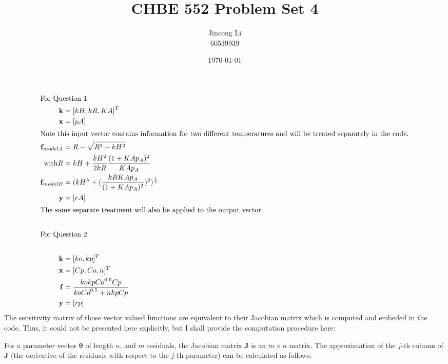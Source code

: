 \documentclass[a4paper,12pt]{article} %
\begin{document}
\setlength{\parskip}{1em} 
\setlength{\parindent}{0pt}
\newcommand{\vect}[1]{\mathbf{#1}}

\title{CHBE 552 Problem Set 4}
\author{Jincong Li \\ 60539939}
\date{\today}
\maketitle

\begin{align*}
    \intertext{For Question 1}
    \vect{k} &= [kH, kR , KA]^T \\
    \vect{x} &= [pA]\\
    \intertext{Note this input vector contains information for two different temperatures and will be
    treated separately in the code.}
    \vect{f}_{model A} &= R - \sqrt{R^2 - kH^2} \\
    \text{with} 
    R &= kH + \frac{kH^2}{2kR}\frac{(1+KAp_A)^2}{KAp_A} \\
    \vect{f}_{model B} &= (kH^{\lambda}+(\frac{kRKAp_A}{(1+KAp_A)^2})^2)^{\frac{1}{\lambda}} \\
    \vect{y} &= [rA]\\
    \intertext{The same separate treatment will also be applied to the output vector.}\\
    \intertext{For Question 2}\\
    \vect{k} &= [ko, kp]^T \\
    \vect{x} &= [Cp, Co, n]^T \\
    \vect{f} &= \frac{ko kp {Co}^{0.5} Cp}{ko {Co}^{0.5} + n kp Cp} \\
    \vect{y} &= [rp]
\end{align*} 
The sensitivity matrix of those vector valued functions are equivalent to their Jacobian matrix which
is computed and embeded in the code. Thus, it could not be presented here explicitly, but I shall provide
the computation procedure here:

For a parameter vector $\boldsymbol{\theta}$ of length $n$, and $m$ residuals, the Jacobian matrix $\mathbf{J}$ is an $m \times n$ matrix. The approximation of the $j$-th column of $\mathbf{J}$ (the derivative of the residuals with respect to the $j$-th parameter) can be calculated as follows:
\end{document}
